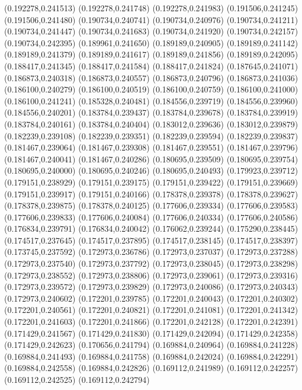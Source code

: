 (0.192278,0.241513)
(0.192278,0.241748)
(0.192278,0.241983)
(0.191506,0.241245)
(0.191506,0.241480)
(0.190734,0.240741)
(0.190734,0.240976)
(0.190734,0.241211)
(0.190734,0.241447)
(0.190734,0.241683)
(0.190734,0.241920)
(0.190734,0.242157)
(0.190734,0.242395)
(0.189961,0.241650)
(0.189189,0.240905)
(0.189189,0.241142)
(0.189189,0.241379)
(0.189189,0.241617)
(0.189189,0.241856)
(0.189189,0.242095)
(0.188417,0.241345)
(0.188417,0.241584)
(0.188417,0.241824)
(0.187645,0.241071)
(0.186873,0.240318)
(0.186873,0.240557)
(0.186873,0.240796)
(0.186873,0.241036)
(0.186100,0.240279)
(0.186100,0.240519)
(0.186100,0.240759)
(0.186100,0.241000)
(0.186100,0.241241)
(0.185328,0.240481)
(0.184556,0.239719)
(0.184556,0.239960)
(0.184556,0.240201)
(0.183784,0.239437)
(0.183784,0.239678)
(0.183784,0.239919)
(0.183784,0.240161)
(0.183784,0.240404)
(0.183012,0.239636)
(0.183012,0.239879)
(0.182239,0.239108)
(0.182239,0.239351)
(0.182239,0.239594)
(0.182239,0.239837)
(0.181467,0.239064)
(0.181467,0.239308)
(0.181467,0.239551)
(0.181467,0.239796)
(0.181467,0.240041)
(0.181467,0.240286)
(0.180695,0.239509)
(0.180695,0.239754)
(0.180695,0.240000)
(0.180695,0.240246)
(0.180695,0.240493)
(0.179923,0.239712)
(0.179151,0.238929)
(0.179151,0.239175)
(0.179151,0.239422)
(0.179151,0.239669)
(0.179151,0.239917)
(0.179151,0.240166)
(0.178378,0.239378)
(0.178378,0.239627)
(0.178378,0.239875)
(0.178378,0.240125)
(0.177606,0.239334)
(0.177606,0.239583)
(0.177606,0.239833)
(0.177606,0.240084)
(0.177606,0.240334)
(0.177606,0.240586)
(0.176834,0.239791)
(0.176834,0.240042)
(0.176062,0.239244)
(0.175290,0.238445)
(0.174517,0.237645)
(0.174517,0.237895)
(0.174517,0.238145)
(0.174517,0.238397)
(0.173745,0.237592)
(0.172973,0.236786)
(0.172973,0.237037)
(0.172973,0.237288)
(0.172973,0.237540)
(0.172973,0.237792)
(0.172973,0.238045)
(0.172973,0.238298)
(0.172973,0.238552)
(0.172973,0.238806)
(0.172973,0.239061)
(0.172973,0.239316)
(0.172973,0.239572)
(0.172973,0.239829)
(0.172973,0.240086)
(0.172973,0.240343)
(0.172973,0.240602)
(0.172201,0.239785)
(0.172201,0.240043)
(0.172201,0.240302)
(0.172201,0.240561)
(0.172201,0.240821)
(0.172201,0.241081)
(0.172201,0.241342)
(0.172201,0.241603)
(0.172201,0.241866)
(0.172201,0.242128)
(0.172201,0.242391)
(0.171429,0.241567)
(0.171429,0.241830)
(0.171429,0.242094)
(0.171429,0.242358)
(0.171429,0.242623)
(0.170656,0.241794)
(0.169884,0.240964)
(0.169884,0.241228)
(0.169884,0.241493)
(0.169884,0.241758)
(0.169884,0.242024)
(0.169884,0.242291)
(0.169884,0.242558)
(0.169884,0.242826)
(0.169112,0.241989)
(0.169112,0.242257)
(0.169112,0.242525)
(0.169112,0.242794)
